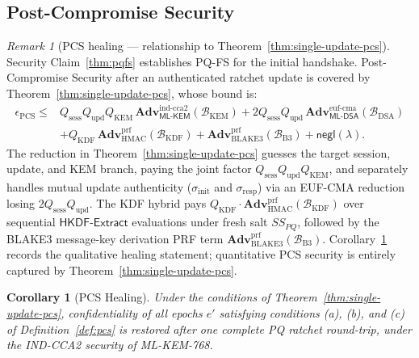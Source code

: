 \documentclass[11pt,a4paper]{article}
\newtheorem{corollary}[theorem]{Corollary}
\theoremstyle{remark}
\newtheorem{remark}[theorem]{Remark}
\theoremstyle{plain}
\newcommand{\negl}{\mathsf{negl}}
\newcommand{\Adv}{\mathbf{Adv}}
\newcommand{\MLKEM}{\mathsf{ML\text{-}KEM}}
\newcommand{\MLDSA}{\mathsf{ML\text{-}DSA}}
\newcommand{\HKDFExtract}{\mathsf{HKDF\text{-}Extract}}
\begin{document}
\subsection{Post-Compromise Security}
\label{sec:pcsproof}

\begin{remark}[PCS healing — relationship to Theorem~\ref{thm:single-update-pcs}]
\label{rem:pcs}
Security Claim~\ref{thm:pqfs} establishes PQ-FS for the initial handshake.
Post-Compromise Security after an authenticated ratchet update is covered by
Theorem~\ref{thm:single-update-pcs}, whose bound is:
\[
\begin{aligned}
\epsilon_{\mathrm{PCS}}
 \leq{}&
 Q_{\mathrm{sess}}Q_{\mathrm{upd}}Q_{\mathrm{KEM}}\,
       \Adv^{\mathrm{ind\text{-}cca2}}_{\MLKEM}(\mathcal{B}_{\mathrm{KEM}})
 +2Q_{\mathrm{sess}}Q_{\mathrm{upd}}\,
       \Adv^{\mathrm{euf\text{-}cma}}_{\MLDSA}(\mathcal{B}_{\mathrm{DSA}})\\
&+Q_{\mathrm{KDF}}\,
       \Adv^{\mathrm{prf}}_{\mathrm{HMAC}}(\mathcal{B}_{\mathrm{KDF}})
 +\Adv^{\mathrm{prf}}_{\mathrm{BLAKE3}}(\mathcal{B}_{\mathrm{B3}})
 + \negl(\lambda).
\end{aligned}
\]
The reduction in Theorem~\ref{thm:single-update-pcs} guesses the target session, update, and
KEM branch, paying the joint factor $Q_{\mathrm{sess}}Q_{\mathrm{upd}}Q_{\mathrm{KEM}}$, and
separately handles mutual update authenticity ($\sigma_{\mathrm{init}}$ and $\sigma_{\mathrm{resp}}$)
via an EUF-CMA reduction losing $2Q_{\mathrm{sess}}Q_{\mathrm{upd}}$.  The KDF hybrid pays
$Q_{\mathrm{KDF}} \cdot \Adv^{\mathrm{prf}}_{\mathrm{HMAC}}(\mathcal{B}_{\mathrm{KDF}})$ over sequential
$\HKDFExtract$ evaluations under fresh salt $SS_{PQ}$, followed by the BLAKE3 message-key derivation
PRF term $\Adv^{\mathrm{prf}}_{\mathrm{BLAKE3}}(\mathcal{B}_{\mathrm{B3}})$.
Corollary~\ref{cor:pcs} records the qualitative healing statement;
quantitative PCS security is entirely captured by Theorem~\ref{thm:single-update-pcs}.
\end{remark}

\begin{corollary}[PCS Healing]
\label{cor:pcs}
Under the conditions of Theorem~\ref{thm:single-update-pcs}, confidentiality of all epochs $e'$
satisfying conditions \emph{(a)}, \emph{(b)}, and \emph{(c)} of Definition~\ref{def:pcs} is
restored after one complete PQ ratchet round-trip, under the IND-CCA2 security of ML-KEM-768.
\end{corollary}
\end{document}
